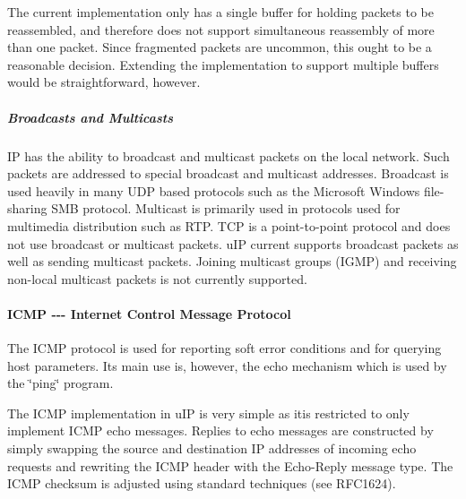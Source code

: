 \-The current implementation only has a single buffer for holding packets to be reassembled, and therefore does not support simultaneous reassembly of more than one packet. \-Since fragmented packets are uncommon, this ought to be a reasonable decision. \-Extending the implementation to support multiple buffers would be straightforward, however.\hypertarget{a00060_ipbroadcast}{}\subparagraph{\-Broadcasts and Multicasts}\label{a00060_ipbroadcast}
\-I\-P has the ability to broadcast and multicast packets on the local network. \-Such packets are addressed to special broadcast and multicast addresses. \-Broadcast is used heavily in many \-U\-D\-P based protocols such as the \-Microsoft \-Windows file-\/sharing \-S\-M\-B protocol. \-Multicast is primarily used in protocols used for multimedia distribution such as \-R\-T\-P. \-T\-C\-P is a point-\/to-\/point protocol and does not use broadcast or multicast packets. u\-I\-P current supports broadcast packets as well as sending multicast packets. \-Joining multicast groups (\-I\-G\-M\-P) and receiving non-\/local multicast packets is not currently supported.\hypertarget{a00060_icmp}{}\paragraph{\-I\-C\-M\-P -\/-\/-\/ Internet Control Message Protocol}\label{a00060_icmp}
\-The \-I\-C\-M\-P protocol is used for reporting soft error conditions and for querying host parameters. \-Its main use is, however, the echo mechanism which is used by the \char`\"{}ping\char`\"{} program.

\-The \-I\-C\-M\-P implementation in u\-I\-P is very simple as itis restricted to only implement \-I\-C\-M\-P echo messages. \-Replies to echo messages are constructed by simply swapping the source and destination \-I\-P addresses of incoming echo requests and rewriting the \-I\-C\-M\-P header with the \-Echo-\/\-Reply message type. \-The \-I\-C\-M\-P checksum is adjusted using standard techniques (see \-R\-F\-C1624).

